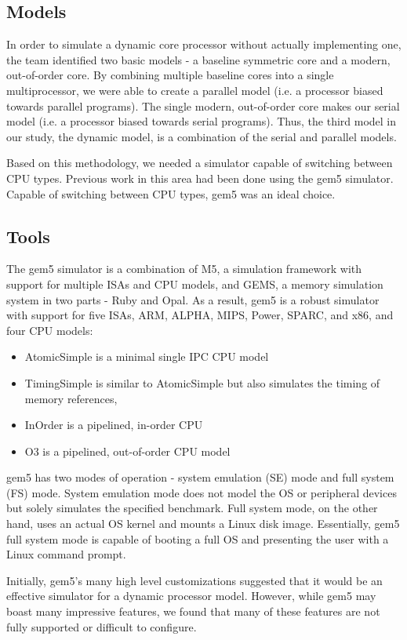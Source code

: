\subsection{Models}
In order to simulate a dynamic core processor without actually implementing one, the team identified two basic models - a baseline symmetric core and a modern, out-of-order core. By combining multiple baseline cores into a single multiprocessor, we were able to create a parallel model (i.e. a processor biased towards parallel programs). The single modern, out-of-order core makes our serial model (i.e. a processor biased towards serial programs). Thus, the third model in our study, the dynamic model, is a combination of the serial and parallel models.

Based on this methodology, we needed a simulator capable of switching between CPU types. Previous work in this area had been done using the gem5 simulator. Capable of switching between CPU types, gem5 was an ideal choice.

\subsection{Tools}
The gem5 simulator \cite{gem5} is a combination of M5, a simulation framework with support for multiple ISAs and CPU models, and GEMS, a memory simulation system in two parts - Ruby and Opal. As a result, gem5 is a robust simulator with support for five ISAs, ARM, ALPHA, MIPS, Power, SPARC, and x86, and four CPU models:

\begin{itemize}
	\item AtomicSimple is a minimal single IPC CPU model
	\item TimingSimple is similar to AtomicSimple but also simulates the timing of memory references,
	\item InOrder is a pipelined, in-order CPU
	\item O3 is a pipelined, out-of-order CPU model
\end{itemize}

gem5 has two modes of operation - system emulation (SE) mode and full system (FS) mode. System emulation mode does not model the OS or peripheral devices but solely simulates the specified benchmark. Full system mode, on the other hand, uses an actual OS kernel and mounts a Linux disk image. Essentially, gem5 full system mode is capable of booting a full OS and presenting the user with a Linux command prompt.

Initially, gem5's many high level customizations suggested that it would be an effective simulator for a dynamic processor model. However, while gem5 may boast many impressive features, we found that many of these features are not fully supported or difficult to configure.

